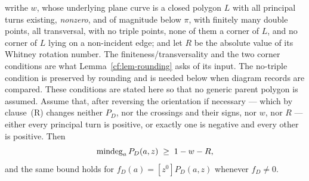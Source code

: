 \begin{theorem}
\begin{enumerate}
writhe $w$, whose underlying plane curve is a closed polygon $L$ with all
principal turns existing, \emph{nonzero}, and of magnitude below $\pi$, with
finitely many double points, all transversal, with no triple points, none of
them a corner of $L$, and no corner of $L$ lying on a non-incident edge; and let
$R$ be the absolute value of its Whitney rotation number.  The
finiteness/transversality and the two corner conditions are what
Lemma~\ref{cf:lem-rounding} asks of its input.  The no-triple condition is preserved by rounding and is needed below
when diagram records are compared.  These
conditions are stated here so that no generic parent polygon is assumed. Assume that, after reversing the
orientation if necessary --- which by clause~(R) changes neither
$P_D$, nor the crossings and their signs, nor $w$, nor $R$ --- either every
principal turn is positive, or exactly one is negative and every other is
positive. Then
\begin{equation}
\operatorname{mindeg}_a P_D(a,z)\;\geq\;1-w-R,
\label{cf:eq-floor}
\end{equation}
and the same bound holds for $f_D(a)=[z^0]P_D(a,z)$ whenever $f_D\neq0$.
\end{enumerate}
\end{theorem}
